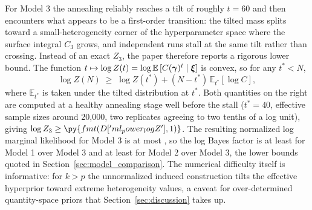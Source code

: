 For Model 3 the annealing reliably reaches a tilt of roughly $t = 60$
and then encounters what appears to be a first-order transition: the
tilted mass splits toward a small-heterogeneity corner of the
hyperparameter space where the surface integral $C_3$ grows, and
independent runs stall at the same tilt rather than crossing. Instead
of an exact $Z_3$, the paper therefore reports a rigorous lower bound.
The function $t \mapsto \log Z(t) = \log \mathbb{E}\left[C(\boldsymbol{\gamma})^t \mid \boldsymbol{\xi}\right]$
is convex, so for any $t^* < N$,
\begin{equation}
  \log Z(N) \;\geq\; \log Z(t^*)
  + (N - t^*)\, \mathbb{E}_{t^*}\!\left[\log C\right],
\end{equation}
where $\mathbb{E}_{t^*}$ is taken under the tilted distribution at
$t^*$. Both quantities on the right are computed at a healthy annealing
stage well before the stall ($t^* = 40$, effective sample sizes around
20{,}000, two replicates agreeing to two tenths of a log unit), giving
$\log Z_3 \geq \py{fmt(D['ml_power_logZ'], 1)}$. The resulting
normalized log marginal likelihood for Model 3 is at most
, so the log Bayes factor is at least
 for Model 1 over Model 3 and at
least  for Model 2 over Model 3, the
lower bounds quoted in Section~\ref{sec:model_comparison}. The
numerical difficulty itself is informative: for $k > p$ the
unnormalized induced construction tilts the effective hyperprior toward
extreme heterogeneity values, a caveat for over-determined
quantity-space priors that Section~\ref{sec:discussion} takes up.
